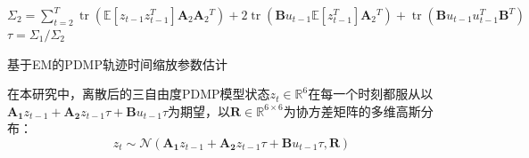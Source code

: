 \begin{algorithm}[htb]
{{{            $\Sigma_2=\sum_{t=2}^T \operatorname{tr}\left(\mathbb{E}\left[z_{t-1} z_{t-1}^T\right] \mathbf{A}_2 \mathbf{A}_2{ }^T\right)+2 \operatorname{tr}\left(\mathbf{B} u_{t-1} \mathbb{E}\left[z_{t-1}^T\right] \mathbf{A}_2{ }^T\right)+\operatorname{tr}\left(\mathbf{B} u_{t-1} u_{t-1}^T \mathbf{B}^T\right)$
        }
        $\tau=\Sigma_1 / \Sigma_2$ \;
      }
    }
    \caption{基于EM的PDMP轨迹时间缩放参数估计}
    \label{algo:4-1}
\end{algorithm}
在本研究中，离散后的三自由度PDMP模型状态$z_t\in \mathbb{R}^{6}$在每一个时刻都服从以$\mathbf{A_1}z_{t-1}+\mathbf{A_2}z_{t-1}\tau+\mathbf{B}u_{t-1}\tau$为期望，以$\mathbf{R} \in \mathbb{R}^{6\times 6}$为协方差矩阵的多维高斯分布：
\begin{equation}
  z_t \sim \mathcal N(\mathbf{A_1}z_{t-1}+\mathbf{A_2}z_{t-1}\tau+\mathbf{B}u_{t-1}\tau,\mathbf{R})
  \label{eq:4-19}
\end{equation}

